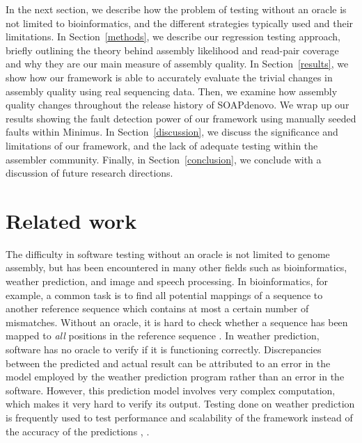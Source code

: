  In the next section,
we describe how the problem of testing without an oracle is not limited to bioinformatics, and the different strategies typically used and their limitations.
In Section~\ref{methods}, we describe our regression testing approach, briefly outlining the theory behind assembly likelihood and read-pair coverage and why they are our main measure of assembly quality.
In Section~\ref{results}, we show how our framework is able to accurately evaluate the trivial changes in assembly quality using real sequencing data.  Then, we examine how assembly quality changes throughout the release history of SOAPdenovo.  We wrap up our results showing the fault detection power of our framework using manually seeded faults within Minimus.
In Section~\ref{discussion}, we discuss the significance and limitations of our framework, and the lack of adequate testing within the assembler community.
Finally, in Section~\ref{conclusion}, we conclude with a discussion of future research directions.

\section{Related work}
\label{related_works}
The difficulty in software testing without an oracle is not limited to genome assembly,
 but has been encountered in many other fields such as bioinformatics, weather prediction, and image and speech processing. In bioinformatics, for example, a common task is to
find all potential mappings of a sequence to another reference sequence which contains at most a certain number of mismatches.
Without an oracle, it is hard to check whether a sequence has been mapped to \emph{all} positions in the reference sequence \cite{chen2009innovative}. In weather prediction, software has no oracle to verify if it is functioning correctly. Discrepancies between the predicted and actual result can be attributed to an error in the model employed by the weather prediction program rather than an error in the software. However, this prediction model involves very complex computation, which makes it very hard to verify its output. Testing done on weather prediction is frequently used to test performance and scalability of the framework instead of the accuracy of the predictions \cite{delgado2010performance}, \cite{michalakes2004weather}.

